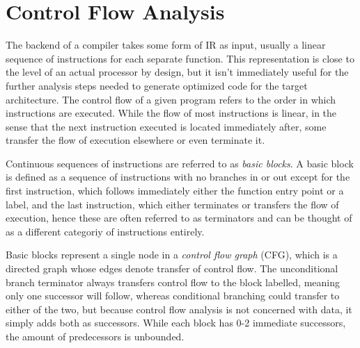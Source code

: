 \documentclass{article}
\begin{document}
\section{Control Flow Analysis}



The backend of a compiler takes some form of IR as input, usually a linear sequence of instructions for each separate function. This representation is close to the level of an actual processor by design, but it isn't immediately useful for the further analysis steps needed to generate optimized code for the target architecture. %
The control flow of a given program refers to the order in which instructions are executed. While the flow of most instructions is linear, in the sense that the next instruction executed is located immediately after, some transfer the flow of execution elsewhere or even terminate it. %


\textcolor{mygreen}{
Continuous sequences of instructions are referred to as \textit{basic blocks}. A basic block is defined as a sequence of instructions with no branches in or out except for the first instruction, which follows immediately either the function entry point or a label,  and the last instruction, which either terminates or transfers the flow of execution, hence these are often referred to as terminators and can be thought of as a different categoriy of instructions entirely.
}

\textcolor{mygreen}{
Basic blocks represent a single node in a \textit{control flow graph} (CFG), which is a directed graph whose edges denote transfer of  control flow. The unconditional branch terminator always transfers control flow to the block labelled, meaning only one successor will follow, whereas conditional branching could transfer to either of the two, but because control flow analysis is not concerned with data, it simply adds both as successors. %
While each block has 0-2 immediate successors, the amount of predecessors is unbounded.
}
\end{document}
